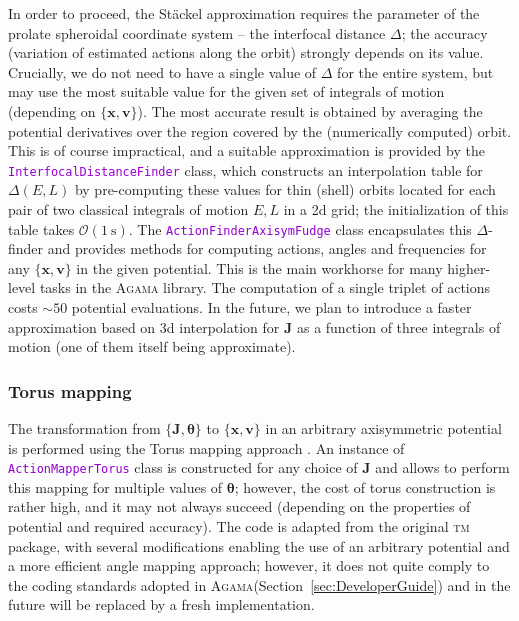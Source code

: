 \documentclass[12pt]{article}
\newcommand{\Agama}{\textsc{Agama}\xspace}
\newcommand{\ttt}[1]{\textcolor{darkviolet}{\texttt{#1}}}
\newcommand{\bv}{\boldsymbol{v}}
\newcommand{\bx}{\boldsymbol{x}}
\newcommand{\bJ}{\boldsymbol{J}}
\newcommand{\bt}{\boldsymbol{\theta}}
\begin{document}
In order to proceed, the St\"ackel approximation requires the parameter of the prolate spheroidal coordinate system -- the interfocal distance $\Delta$; the accuracy (variation of estimated actions along the orbit) strongly depends on its value. Crucially, we do not need to have a single value of $\Delta$ for the entire system, but may use the most suitable value for the given set of integrals of motion (depending on $\{\bx,\bv\}$).
The most accurate result is obtained by averaging the potential derivatives over the region covered by the (numerically computed) orbit. This is of course impractical, and a suitable approximation is provided by the \ttt{InterfocalDistanceFinder} class, which constructs an interpolation table for $\Delta(E,L)$ by pre-computing these values for thin (shell) orbits located for each pair of two classical integrals of motion $E, L$ in a 2d grid; the initialization of this table takes $\mathcal{O}(1~\mathrm{s})$. The \ttt{ActionFinderAxisymFudge} class encapsulates this $\Delta$-finder and provides methods for computing actions, angles and frequencies for any $\{\bx,\bv\}$ in the given potential. This is the main workhorse for many higher-level tasks in the \Agama library. 
The computation of a single triplet of actions costs $\sim 50$ potential evaluations. In the future, we plan to introduce a faster approximation based on 3d interpolation for $\bJ$ as a function of three integrals of motion (one of them itself being approximate).

\subsubsection{Torus mapping}  \label{sec:ActionsTorus}

The transformation from $\{\bJ, \bt\}$ to $\{\bx,\bv\}$ in an arbitrary axisymmetric potential is performed using the Torus mapping approach \cite{BinneyMcMillan2016}. An instance of \ttt{ActionMapperTorus} class is constructed for any choice of $\bJ$ and allows to perform this mapping for multiple values of $\bt$; however, the cost of torus construction is rather high, and it may not always succeed (depending on the properties of potential and required accuracy). The code is adapted from the original \textsc{tm} package, with several modifications enabling the use of an arbitrary potential and a more efficient angle mapping approach; however, it does not quite comply to the coding standards adopted in \Agama (Section~\ref{sec:DeveloperGuide}) and in the future will be replaced by a fresh implementation. 
\end{document}
